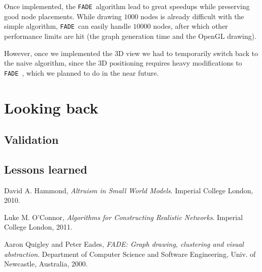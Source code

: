 \documentclass[a4paper,11pt,titlepage]{article}
\let\stdsection\section         %
\renewcommand{\section}{\newpage\stdsection}
\newcommand{\FADE}{\texttt{FADE}\ }
\begin{document}
Once implemented, the \FADE algorithm lead to great speedups while
preserving good node placements. While drawing \(1000\) nodes is
already difficult with the simple algorithm, \FADE can easily handle
\(10000\) nodes, after which other performance limits are hit (the
graph generation time and the OpenGL drawing).

However, once we implemented the 3D view we had to temporarily switch
back to the naive algorithm, since the 3D positioning requires heavy
modifications to \FADE, which we planned to do in the near future.

\section{Looking back}

\subsection{Validation}

\subsection{Lessons learned}

\begin{thebibliography}{9}

  David A. Hammond,
  \emph{Altruism in Small World Models}.
  Imperial College London,
  2010.

  Luke M. O'Connor,
  \emph{Algorithms for Constructing Realistic Networks}.
  Imperial College London,
  2011.

  Aaron Quigley and Peter Eades,
  \emph{FADE: Graph drawing, clustering and visual abstraction}.
  Department of Computer Science and Software Engineering,
  Univ. of  Newcastle, Australia, 2000.

\end{thebibliography}
\end{document}
